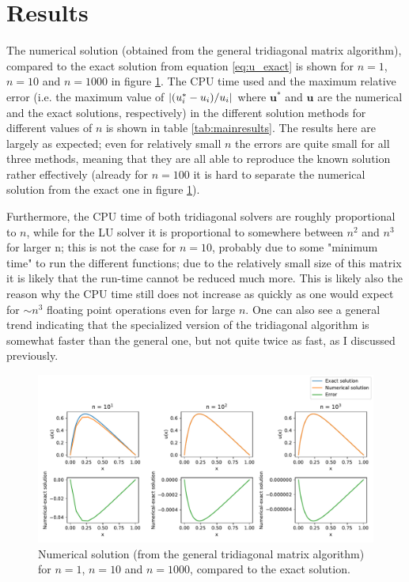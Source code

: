 \documentclass[a4paper,english]{article}
\renewcommand\vec{\mathbf}
\newcommand\norm[1]{\left\lvert#1\right\rvert}
\let\originalleft\left
\let\originalright\right
\renewcommand{\left}{\mathopen{}\mathclose\bgroup\originalleft}
\renewcommand{\right}{\aftergroup\egroup\originalright}
\begin{document}
\section{Results}
The numerical solution (obtained from the general tridiagonal matrix algorithm), compared to the exact solution from equation \ref{eq:u_exact} is shown for $n=1$, $n=10$ and $n=1000$ in figure \ref{fig:general_plot}. The CPU time used and the maximum relative error (i.e. the maximum value of $\norm{\left(u^*_i-u_i\right)/u_i}$ where $\vec{u}^*$ and $\vec{u}$ are the numerical and the exact solutions, respectively) in the different solution methods for different values of $n$ is shown in table \ref{tab:mainresults}. The results here are largely as expected; even for relatively small $n$ the errors are quite small for all three methods, meaning that they are all able to reproduce the known solution rather effectively (already for $n=100$ it is hard to separate the numerical solution from the exact one in figure \ref{fig:general_plot}). \par
Furthermore, the CPU time of both tridiagonal solvers are roughly proportional to $n$, while for the LU solver it is proportional to somewhere between $n^2$ and $n^3$ for larger n; this is not the case for $n=10$, probably due to some "minimum time" to run the different functions; due to the relatively small size of this matrix it is likely that the run-time cannot be reduced much more. This is likely also the reason why the CPU time still does not increase as quickly as one would expect for $\sim n^3$ floating point operations even for large $n$. One can also see a general trend indicating that the specialized version of the tridiagonal algorithm is somewhat faster than the general one, but not quite twice as fast, as I discussed previously. \par
\begin{figure}[ht]
  \centering
  \includegraphics[width=0.96\linewidth]{general_plot.pdf}
  \caption{Numerical solution (from the general tridiagonal matrix algorithm) for $n=1$, $n=10$ and $n=1000$, compared to the exact solution.}
  \label{fig:general_plot}
\end{figure}
\end{document}
